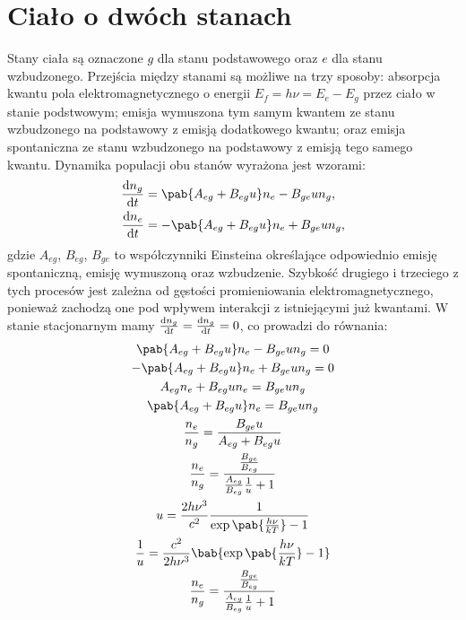 \section{Ciało o dwóch stanach}
Stany ciała są oznaczone \(g\) dla stanu podstawowego oraz \(e\) dla stanu wzbudzonego. Przejścia między stanami są możliwe na trzy sposoby: absorpcja kwantu pola elektromagnetycznego o energii \(E_f = h\nu = E_e - E_g\) przez ciało w stanie podstwowym; emisja wymuszona tym samym kwantem ze stanu wzbudzonego na podstawowy z emisją dodatkowego kwantu; oraz emisja spontaniczna ze stanu wzbudzonego na podstawowy z emisją tego samego kwantu. Dynamika populacji obu stanów wyrażona jest wzorami:
\begin{align}
	\odv{n_g}{t} &=   \pab{A_{eg} + B_{eg} u}n_e - B_{ge} u n_g, \\
	\odv{n_e}{t} &= - \pab{A_{eg} + B_{eg} u}n_e + B_{ge} u n_g,
\end{align}
gdzie \(A_{eg}\), \(B_{eg}\), \(B_{ge}\) to współczynniki Einsteina określające odpowiednio emisję spontaniczną, emisję wymuszoną oraz wzbudzenie. Szybkość drugiego i trzeciego z tych procesów jest zależna od gęstości promieniowania elektromagnetycznego, ponieważ zachodzą one pod wpływem interakcji z istniejącymi już kwantami. W stanie stacjonarnym mamy \(\odv{n_g}{t} = \odv{n_g}{t} = 0\), co prowadzi do równania:
\begin{gather}
	  \pab{A_{eg} + B_{eg} u}n_e - B_{ge} u n_g = 0 \\
	- \pab{A_{eg} + B_{eg} u}n_e + B_{ge} u n_g = 0 \\
	A_{eg} n_e + B_{eg} u n_e = B_{ge} u n_g \\
	\pab{A_{eg} + B_{eg} u} n_e = B_{ge} u n_g \\
	\frac{n_e}{n_g} = \frac{B_{ge} u}{A_{eg} + B_{eg} u} \\
	\frac{n_e}{n_g} = \frac{\frac{B_{ge}}{B_{eg}}}{\frac{A_{eg}}{B_{eg}}\inv{u} + 1} \\
	u = \frac{2h\nu^3}{c^2}\inv{\exp\pab{\frac{h\nu}{kT}} - 1} \\
	\inv{u} = \frac{c^2}{2h\nu^3}\bab{\exp\pab{\frac{h\nu}{kT}} - 1} \\
	\frac{n_e}{n_g} = \frac{\frac{B_{ge}}{B_{eg}}}{\frac{A_{eg}}{B_{eg}}\inv{u} + 1} \\
\end{gather}


